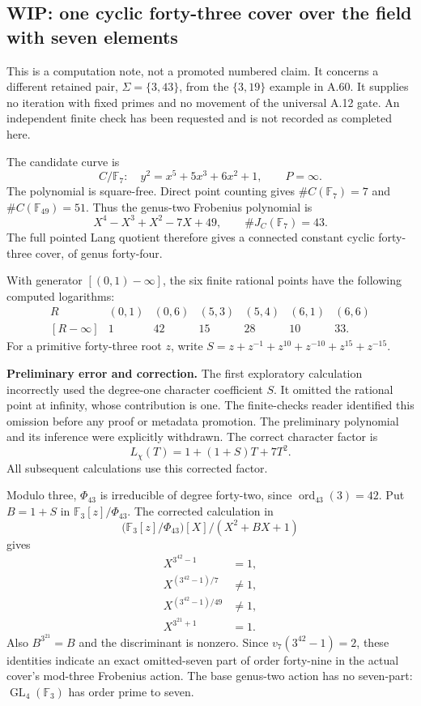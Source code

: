 \subsection*{WIP: one cyclic forty-three cover over the field with seven elements}

This is a computation note, not a promoted numbered claim.
It concerns a different retained pair, $\Sigma=\{3,43\}$,
from the $\{3,19\}$ example in A.60.
It supplies no iteration with fixed primes and no movement
of the universal A.12 gate.  An independent finite check
has been requested and is not recorded as completed here.

The candidate curve is
\[
 C/\mathbb F_7:\quad y^2=x^5+5x^3+6x^2+1,
 \qquad P=\infty .
\]
The polynomial is square-free.  Direct point counting gives
$\#C(\mathbb F_7)=7$ and $\#C(\mathbb F_{49})=51$.
Thus the genus-two Frobenius polynomial is
\[
 X^4-X^3+X^2-7X+49,\qquad \#J_C(\mathbb F_7)=43.
\]
The full pointed Lang quotient therefore gives a connected
constant cyclic forty-three cover, of genus forty-four.

With generator $[(0,1)-\infty]$, the six finite rational
points have the following computed logarithms:
\[
\begin{array}{c|rrrrrr}
 R&(0,1)&(0,6)&(5,3)&(5,4)&(6,1)&(6,6)\\ \hline
 [R-\infty]&1&42&15&28&10&33 .
\end{array}
\]
For a primitive forty-three root $z$, write
$S=z+z^{-1}+z^{10}+z^{-10}+z^{15}+z^{-15}$.

\medskip\noindent\textbf{Preliminary error and correction.}
The first exploratory calculation incorrectly used the
degree-one character coefficient $S$.  It omitted the
rational point at infinity, whose contribution is one.
The finite-checks reader identified this omission before
any proof or metadata promotion.  The preliminary
polynomial and its inference were explicitly withdrawn.
The correct character factor is
\[
             L_\chi(T)=1+(1+S)T+7T^2 .
\]
All subsequent calculations use this corrected factor.

Modulo three, $\Phi_{43}$ is irreducible of degree forty-two,
since $\operatorname{ord}_{43}(3)=42$.
Put $B=1+S$ in $\mathbb F_3[z]/\Phi_{43}$.
The corrected calculation in
\[
 \bigl(\mathbb F_3[z]/\Phi_{43}\bigr)[X]/(X^2+BX+1)
\]
gives
\[
\begin{split}
 X^{3^{42}-1}&=1,\\
 X^{(3^{42}-1)/7}&\ne1,\\
 X^{(3^{42}-1)/49}&\ne1,\\
 X^{3^{21}+1}&=1.
\end{split}
\]
Also $B^{3^{21}}=B$ and the discriminant is nonzero.
Since $v_7(3^{42}-1)=2$, these identities indicate
an exact omitted-seven part of order forty-nine
in the actual cover's mod-three Frobenius action.
The base genus-two action has no seven-part:
$\operatorname{GL}_4(\mathbb F_3)$ has order prime
to seven.

